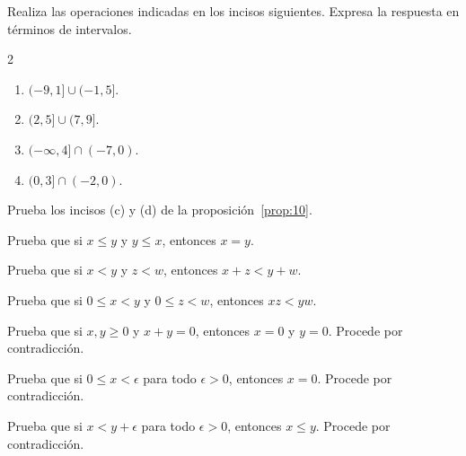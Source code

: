 \documentclass[12pt,a4paper]{book}
\begin{document}
    \begin{ejercicio}\label{ej:25}
        Realiza las operaciones indicadas en los incisos siguientes. Expresa
        la respuesta en términos de intervalos.
        \begin{multicols}{2}
        \begin{enumerate}[nosep]
            \item $(-9,1]\cup(-1,5]$.
            \item $(2,5]\cup(7,9]$.
            \item $(-\infty,4]\cap(-7,0)$.
            \item $(0,3]\cap(-2,0)$.
        \end{enumerate}
        \end{multicols}
    \end{ejercicio}

    \begin{ejercicio}\label{ej:26}
        Prueba los incisos (c) y (d) de la proposición~\ref{prop:10}.
    \end{ejercicio}

    \begin{ejercicio}\label{ej:27}
        Prueba que si $x\leq y$ y $y\leq x$, entonces $x=y$.
    \end{ejercicio}

    \begin{ejercicio}\label{ej:28}
        Prueba que si $x<y$ y $z<w$, entonces $x+z<y+w$.
    \end{ejercicio}

    \begin{ejercicio}\label{ej:29}
        Prueba que si $0\leq x<y$ y $0\leq z<w$, entonces $xz<yw$.
    \end{ejercicio}

    \begin{ejercicio}\label{ej:30}
        Prueba que si $x,y\geq 0$ y $x+y=0$, entonces $x=0$ y $y=0$.
        \sugerencia Procede por contradicción.
    \end{ejercicio}

    \begin{ejercicio}\label{ej:31}
        Prueba que si $0\leq x<\epsilon$ para todo $\epsilon>0$, entonces $x=0$.
        \sugerencia Procede por contradicción.
    \end{ejercicio}

    \begin{ejercicio}\label{ej:32}
        Prueba que si $x<y+\epsilon$ para todo $\epsilon>0$, entonces $x\leq y$.
        \sugerencia Procede por contradicción.
    \end{ejercicio}
\end{document}
